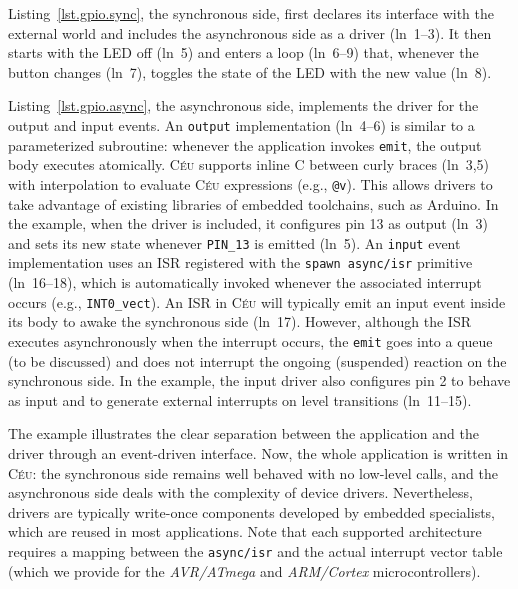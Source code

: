 \documentclass[sigplan,10pt,review,anonymous]{acmart}\settopmatter{printfolios=true,printccs=false,printacmref=false}
\newcommand{\CEU}{\textsc{C\'{e}u}\xspace}
\newcommand{\code}[1] {{\small{\texttt{#1}}}}
\begin{document}
Listing~\ref{lst.gpio.sync}, the synchronous side, first declares its interface
with the external world and includes the asynchronous side as a driver
(ln~1--3).
It then starts with the LED off (ln~5) and enters a loop (ln~6--9) that,
whenever the button changes (ln~7), toggles the state of the LED with the new
value (ln~8).

Listing~\ref{lst.gpio.async}, the asynchronous side, implements the driver for
the output and input events.
%
An \code{output} implementation (ln~4--6) is similar to a parameterized
subroutine: whenever the application invokes \code{emit}, the output body
executes atomically.
\CEU supports inline C between curly braces (ln~3,5) with interpolation to
evaluate \CEU expressions (e.g., \code{@v}).
This allows drivers to take advantage of existing libraries of embedded
toolchains, such as Arduino.
%
In the example, when the driver is included, it configures pin 13 as output
(ln~3) and sets its new state whenever \code{PIN\_13} is emitted (ln~5).
%
An \code{input} event implementation uses an ISR registered with the
\code{spawn async/isr} primitive (ln~16--18), which is automatically invoked
whenever the associated interrupt occurs (e.g., \code{INT0\_vect}).
%
An ISR in \CEU will typically emit an input event inside its body to awake the
synchronous side (ln~17).
However, although the ISR executes asynchronously when the interrupt occurs,
the \code{emit} goes into a queue (to be discussed) and does not interrupt the
ongoing (suspended) reaction on the synchronous side.
%
In the example, the input driver also configures pin 2 to behave as input and
to generate external interrupts on level transitions (ln~11--15).

The example illustrates the clear separation between the application and the
driver through an event-driven interface. %
%
Now, the whole application is written in \CEU:
    the synchronous side remains well behaved with no low-level calls, and
    the asynchronous side deals with the complexity of device drivers.
%
Nevertheless, drivers are typically write-once components developed by embedded
specialists, which are reused in most applications.
%
Note that each supported architecture requires a mapping between the
\code{async/isr} and the actual interrupt vector table (which we provide
for the \emph{AVR/ATmega} and \emph{ARM/Cortex} microcontrollers).
\end{document}
